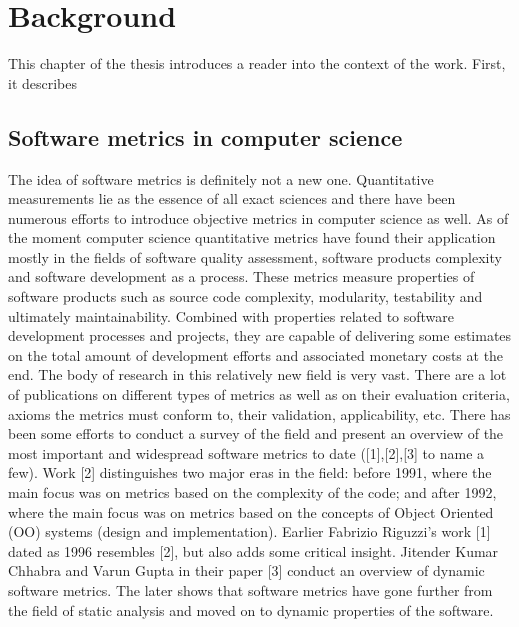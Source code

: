 \chapter{Background} \label{backgroud}

\qquad This chapter of the thesis introduces a reader into the context of the work. First, it describes  

\section{Software metrics in computer science} \label{background-software-metrics-in-cs}
\qquad The idea of software metrics is definitely not a new one. Quantitative
measurements lie as the essence of all exact sciences and there have been numerous efforts to introduce objective metrics in computer science as well.
As of the moment computer science quantitative metrics have found their
application mostly in the fields of software quality assessment, software products complexity and software development as a process. These metrics measure
properties of software products such as source code complexity, modularity,
testability and ultimately maintainability. Combined with properties related to
software development processes and projects, they are capable of delivering some
estimates on the total amount of development efforts and associated monetary costs at the end. The body of research in this relatively new field is very vast. There are a lot of publications on different types of metrics as well as on their evaluation criteria, axioms the metrics must conform to, their validation, applicability, etc. There has been some efforts to conduct a survey of the field and present an overview of the most important and widespread software metrics to date ([1],[2],[3] to name a few). Work [2] distinguishes two major eras in the field: before 1991, where the main focus was on metrics based on the complexity of the code; and after 1992, where the main focus was on metrics based on the concepts of Object Oriented (OO) systems (design and implementation). Earlier Fabrizio Riguzzi's work [1] dated as 1996 resembles
[2], but also adds some critical insight. Jitender Kumar Chhabra and Varun Gupta in their paper [3] conduct an overview of dynamic software metrics. The later shows that software metrics have gone further from the field of static analysis and moved on to dynamic properties of the software.

